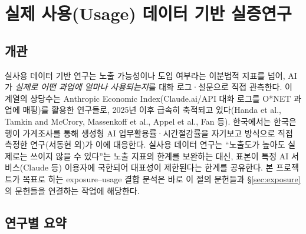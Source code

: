 \documentclass[11pt]{article}
\begin{document}
\section{실제 사용(Usage) 데이터 기반 실증연구}
\label{sec:usage}

\subsection{개관}

실사용 데이터 기반 연구는 노출 가능성이나 도입 여부라는 이분법적 지표를 넘어, AI가 \emph{실제로 어떤 과업에 얼마나 사용되는지}를 대화 로그·설문으로 직접 관측한다. 이 계열의 상당수는 Anthropic Economic Index(Claude.ai/API 대화 로그를 O*NET 과업에 매핑)를 활용한 연구들로, 2025년 이후 급속히 축적되고 있다(Handa et al., Tamkin and McCrory, Massenkoff et al., Appel et al., Fan 등). 한국에서는 한국은행이 가계조사를 통해 생성형 AI 업무활용률·시간절감률을 자기보고 방식으로 직접 측정한 연구(서동현 외)가 이에 대응한다. 실사용 데이터 연구는 ``노출도가 높아도 실제로는 쓰이지 않을 수 있다''는 노출 지표의 한계를 보완하는 대신, 표본이 특정 AI 서비스(Claude 등) 이용자에 국한되어 대표성이 제한된다는 한계를 공유한다. 본 프로젝트가 목표로 하는 exposure--usage 결합 분석은 바로 이 절의 문헌들과 \S\ref{sec:exposure}의 문헌들을 연결하는 작업에 해당한다.

\subsection{연구별 요약}
\end{document}
